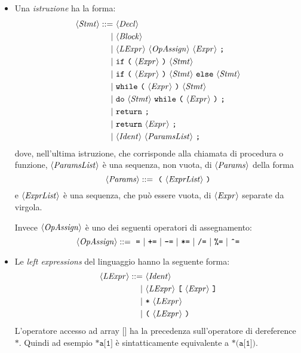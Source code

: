 \begin{itemize}
	\item Una \emph{istruzione} ha la forma:
	\begin{align*}
	\langle \mathit{Stmt} \rangle ::=\ &\langle \mathit{Decl} \rangle\\
	|\ &\langle \mathit{Block} \rangle\\
	|\ &\langle \mathit{LExpr} \rangle\ \langle \mathit{OpAssign} \rangle\ \langle \mathit{Expr} \rangle\ \texttt{;}\\
	|\ &\texttt{if}\ \texttt{(}\ \langle \mathit{Expr} \rangle\ \texttt{)}\ \langle \mathit{Stmt} \rangle\\
	|\ &\texttt{if}\ \texttt{(}\ \langle \mathit{Expr} \rangle\ \texttt{)}\ \langle \mathit{Stmt} \rangle\ \texttt{else}\ \langle \mathit{Stmt} \rangle\\
	|\ &\texttt{while}\ \texttt{(}\ \langle \mathit{Expr} \rangle\ \texttt{)}\ \langle \mathit{Stmt} \rangle\\
	|\ &\texttt{do}\ \langle \mathit{Stmt} \rangle\ \texttt{while}\ \texttt{(}\ \langle \mathit{Expr} \rangle\ \texttt{)}\ \texttt{;}\\
	|\ &\texttt{return}\ \texttt{;}\\
	|\ &\texttt{return}\ \langle \mathit{Expr} \rangle\ \texttt{;}\\
	|\ &\langle \mathit{Ident} \rangle\ \langle \mathit{ParamsList} \rangle\ \texttt{;}
	\end{align*}
	dove, nell'ultima istruzione, che corrisponde alla chiamata di procedura o funzione, $\langle \mathit{ParamsList} \rangle$ è una sequenza, non vuota, di $\langle \mathit{Params} \rangle$ della forma
	\begin{equation*}
	\langle \mathit{Params} \rangle ::=\ \texttt{(}\ \langle \mathit{ExprList} \rangle\ \texttt{)}
	\end{equation*}
	e $\langle \mathit{ExprList} \rangle$ è una sequenza, che può essere vuota, di $\langle \mathit{Expr} \rangle$ separate da virgola.
	
	Invece $\langle \mathit{OpAssign} \rangle$ è uno dei seguenti operatori di assegnamento:
	\begin{equation*}
	\langle \mathit{OpAssign} \rangle ::=\ \texttt{=}\ |\ \texttt{+=}\ |\ \texttt{-=}\ |\ \texttt{*=}\ |\ \texttt{/=}\ |\ \texttt{\%=}\ |\ \texttt{\^{}=}
	\end{equation*}
	
	\item Le \emph{left expressions} del linguaggio hanno la seguente forma:
	\begin{align*}
	\langle \mathit{LExpr} \rangle ::=\ &\langle \mathit{Ident} \rangle\\
	|\ &\langle \mathit{LExpr} \rangle\ \texttt{[}\ \langle \mathit{Expr} \rangle\ \texttt{]}\\
	|\ &\texttt{*}\ \langle \mathit{LExpr} \rangle\\
	|\ &\texttt{(}\ \langle \mathit{LExpr} \rangle\ \texttt{)}
	\end{align*}
	L'operatore accesso ad array $\texttt{[]}$ ha la precedenza sull'operatore di dereference $\texttt{*}$. Quindi ad esempio $\texttt{*a[1]}$ è sintatticamente equivalente a $\texttt{*(a[1])}$.
	

\end{itemize}
